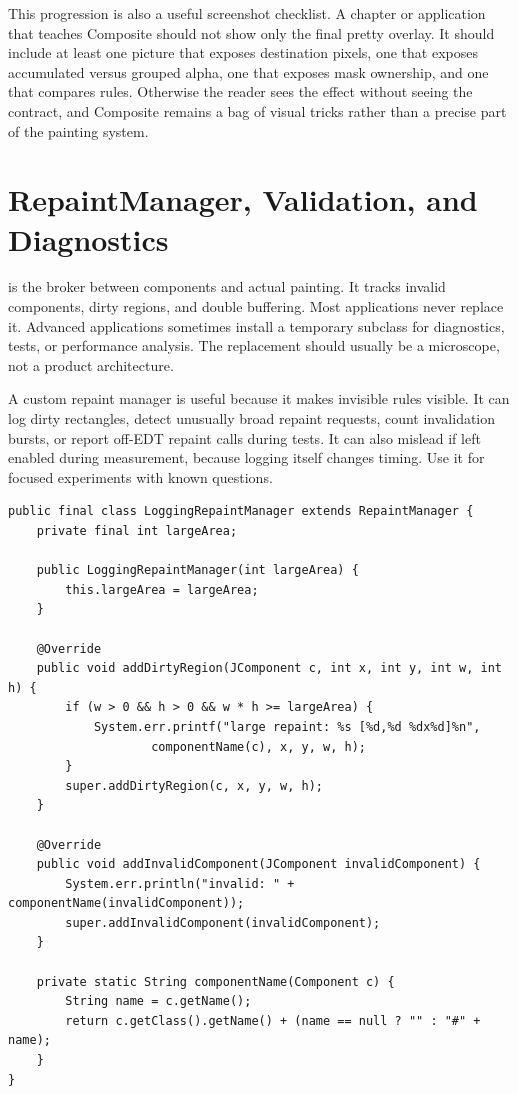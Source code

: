 This progression is also a useful screenshot checklist. A chapter or application that teaches Composite should not show only the final pretty overlay. It should include at least one picture that exposes destination pixels, one that exposes accumulated versus grouped alpha, one that exposes mask ownership, and one that compares rules. Otherwise the reader sees the effect without seeing the contract, and Composite remains a bag of visual tricks rather than a precise part of the painting system.

\section{RepaintManager, Validation, and Diagnostics}

 is the broker between components and actual painting. It tracks invalid components, dirty regions, and double buffering. Most applications never replace it. Advanced applications sometimes install a temporary subclass for diagnostics, tests, or performance analysis. The replacement should usually be a microscope, not a product architecture.

A custom repaint manager is useful because it makes invisible rules visible. It can log dirty rectangles, detect unusually broad repaint requests, count invalidation bursts, or report off-EDT repaint calls during tests. It can also mislead if left enabled during measurement, because logging itself changes timing. Use it for focused experiments with known questions.

\begin{lstlisting}[caption={A diagnostic RepaintManager that reports unusually large repaint requests.}]
public final class LoggingRepaintManager extends RepaintManager {
    private final int largeArea;

    public LoggingRepaintManager(int largeArea) {
        this.largeArea = largeArea;
    }

    @Override
    public void addDirtyRegion(JComponent c, int x, int y, int w, int h) {
        if (w > 0 && h > 0 && w * h >= largeArea) {
            System.err.printf("large repaint: %s [%d,%d %dx%d]%n",
                    componentName(c), x, y, w, h);
        }
        super.addDirtyRegion(c, x, y, w, h);
    }

    @Override
    public void addInvalidComponent(JComponent invalidComponent) {
        System.err.println("invalid: " + componentName(invalidComponent));
        super.addInvalidComponent(invalidComponent);
    }

    private static String componentName(Component c) {
        String name = c.getName();
        return c.getClass().getName() + (name == null ? "" : "#" + name);
    }
}
\end{lstlisting}

